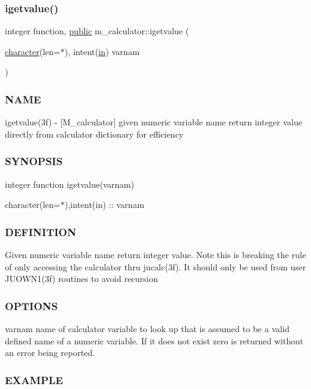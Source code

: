 \subsubsection{\texorpdfstring{igetvalue()}{igetvalue()}}
{\footnotesize\ttfamily integer function, \hyperlink{M__stopwatch_83_8txt_a2f74811300c361e53b430611a7d1769f}{public} m\+\_\+calculator\+::igetvalue (\begin{DoxyParamCaption}\item[{\hyperlink{option__stopwatch_83_8txt_abd4b21fbbd175834027b5224bfe97e66}{character}(len=$\ast$), intent(\hyperlink{M__journal_83_8txt_afce72651d1eed785a2132bee863b2f38}{in})}]{varnam }\end{DoxyParamCaption})}



\subsubsection*{N\+A\+ME}

igetvalue(3f) -\/ \mbox{[}M\+\_\+calculator\mbox{]} given numeric variable name return integer value directly from calculator dictionary for efficiency \subsubsection*{S\+Y\+N\+O\+P\+S\+IS}

integer function igetvalue(varnam)

character(len=$\ast$),intent(in) \+:\+: varnam

\subsubsection*{D\+E\+F\+I\+N\+I\+T\+I\+ON}

Given numeric variable name return integer value. Note this is breaking the rule of only accessing the calculator thru jucalc(3f). It should only be used from user J\+U\+O\+W\+N1(3f) routines to avoid recursion \subsubsection*{O\+P\+T\+I\+O\+NS}

varnam name of calculator variable to look up that is assumed to be a valid defined name of a numeric variable. If it does not exist zero is returned without an error being reported.

\subsubsection*{E\+X\+A\+M\+P\+LE}

